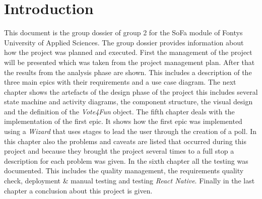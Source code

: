 \section{Introduction}
\label{sec:introduction}
This document is the group dossier of group 2 for the SoFa module of Fontys University of Applied Sciences. The group dossier provides information about how the project was planned and executed. 
\newline
First the management of the project will be presented which was taken from the project management plan. After that the results from the analysis phase are shown. This includes a description of the three main epics with their requirements and a use case diagram. 
\newline
The next chapter shows the artefacts of the design phase of the project this includes several state machine and activity diagrams, the component structure, the visual design and the definition of the \textit{Vote4Fun} object. The fifth chapter deals with the implementation of the first epic. It shows how the first epic was implemented using a \textit{Wizard} that uses stages to lead the user through the creation of a poll. In this chapter also the problems and caveats are listed that occurred during this project and because they brought the project several times to a full stop a description for each problem was given.  
\newline
In the sixth chapter all the testing was documented. This includes the quality management, the requirements quality check, deployment \& manual testing and testing \textit{React Native}. Finally in the last chapter a conclusion about this project is given. 
